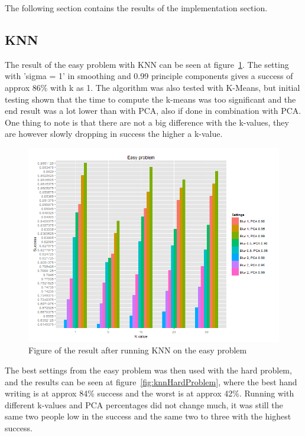 \documentclass[report]{subfiles}
\begin{document}
\label{sec:result}
The following section contains the results of the implementation section.

\subsection{KNN}
\label{sec:resultKNN}
The result of the easy problem with KNN can be seen at figure~\ref{fig:knnEasyProblem}. The setting with 'sigma = 1' in smoothing and 0.99 principle components gives a success of approx 86\% with k as 1. The algorithm was also tested with K-Means, but initial testing shown that the time to compute the k-means was too significant and the end result was a lot lower than with PCA, also if done in combination with PCA.\\
One thing to note is that there are not a big difference with the k-values, they are however slowly dropping in success the higher a k-value.

\begin{figure}[H]
	\centering
	\includegraphics[width=1\textwidth]{images/knnEasyProblem}
	\caption{Figure of the result after running KNN on the easy problem}
	\label{fig:knnEasyProblem}
\end{figure}

The best settings from the easy problem was then used with the hard problem, and the results can be seen at figure~\ref{fig:knnHardProblem}, where the best hand writing is at approx 84\% success and the worst is at approx 42\%. Running with different k-values and PCA percentages did not change much, it was still the same two people low in the success and the same two to three with the highest success.
\end{document}

